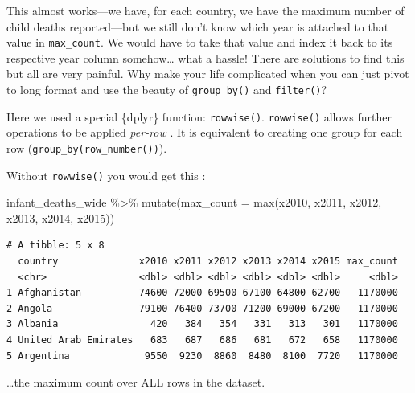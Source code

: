 \documentclass[
  letterpaper,
  DIV=11,
  numbers=noendperiod]{scrreprt}
\newenvironment{Shaded}{\begin{snugshade}}{\end{snugshade}}
\newcommand{\AttributeTok}[1]{\textcolor[rgb]{0.40,0.45,0.13}{#1}}
\newcommand{\FunctionTok}[1]{\textcolor[rgb]{0.28,0.35,0.67}{#1}}
\newcommand{\NormalTok}[1]{\textcolor[rgb]{0.00,0.23,0.31}{#1}}
\newcommand{\SpecialCharTok}[1]{\textcolor[rgb]{0.37,0.37,0.37}{#1}}
\begin{document}
This almost works---we have, for each country, we have the maximum
number of child deaths reported---but we still don't know which year is
attached to that value in \texttt{max\_count}. We would have to take
that value and index it back to its respective year column
somehow\ldots{} what a hassle! There are solutions to find this but all
are very painful. Why make your life complicated when you can just pivot
to long format and use the beauty of \texttt{group\_by()} and
\texttt{filter()}?

\begin{tcolorbox}[enhanced jigsaw, title=\textcolor{quarto-callout-note-color}{\faInfo}\hspace{0.5em}{Side Note}, colbacktitle=quarto-callout-note-color!10!white, leftrule=.75mm, arc=.35mm, opacityback=0, bottomrule=.15mm, rightrule=.15mm, toptitle=1mm, breakable, toprule=.15mm, colback=white, coltitle=black, colframe=quarto-callout-note-color-frame, bottomtitle=1mm, titlerule=0mm, left=2mm, opacitybacktitle=0.6]

Here we used a special \{dplyr\} function: \texttt{rowwise()}.
\texttt{rowwise()} allows further operations to be applied
\emph{per-row} . It is equivalent to creating one group for each row
(\texttt{group\_by(row\_number())}).

Without \texttt{rowwise()} you would get this :

\begin{Shaded}
\begin{Highlighting}[]
\NormalTok{infant\_deaths\_wide }\SpecialCharTok{\%\textgreater{}\%} 
  \FunctionTok{mutate}\NormalTok{(}\AttributeTok{max\_count =} \FunctionTok{max}\NormalTok{(x2010, x2011, x2012, x2013, x2014, x2015))}
\end{Highlighting}
\end{Shaded}

\begin{verbatim}
# A tibble: 5 x 8
  country              x2010 x2011 x2012 x2013 x2014 x2015 max_count
  <chr>                <dbl> <dbl> <dbl> <dbl> <dbl> <dbl>     <dbl>
1 Afghanistan          74600 72000 69500 67100 64800 62700   1170000
2 Angola               79100 76400 73700 71200 69000 67200   1170000
3 Albania                420   384   354   331   313   301   1170000
4 United Arab Emirates   683   687   686   681   672   658   1170000
5 Argentina             9550  9230  8860  8480  8100  7720   1170000
\end{verbatim}

\ldots the maximum count over ALL rows in the dataset.

\end{tcolorbox}
\end{document}
